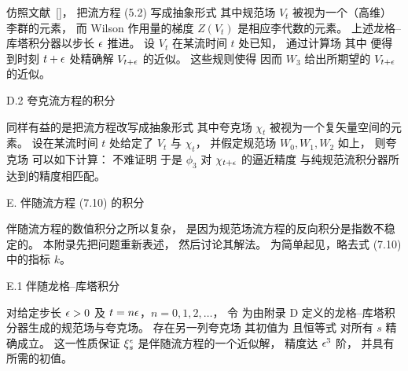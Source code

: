 仿照文献~[\cite{WilsonFlow}]，
把流方程 (5.2) 写成抽象形式
其中规范场 $V_t$
被视为一个（高维）李群的元素，
而 Wilson 作用量的梯度 $Z(V_t)$ 是相应李代数的元素。
上述龙格--库塔积分器以步长 $\epsilon$ 推进。
设 $V_t$ 在某流时间 $t$ 处已知，
通过计算场
其中
便得到时刻 $t+\epsilon$ 处精确解 $V_{t+\epsilon}$ 的近似。
这些规则使得
因而 $W_3$ 给出所期望的 $V_{t+\epsilon}$ 的近似。


\lussubsec D.2 夸克流方程的积分

同样有益的是把流方程改写成抽象形式
其中夸克场 $\chi_t$ 被视为一个复矢量空间的元素。
设在某流时间 $t$ 处给定了 $V_t$ 与 $\chi_t$，
并假定规范场 $W_0,W_1,W_2$ 如上，
则夸克场
可以如下计算：
不难证明
于是 $\phi_3$ 对 $\chi_{t+\epsilon}$ 的逼近精度
与纯规范流积分器所达到的精度相匹配。



\lusapp E. 伴随流方程 (7.10) 的积分

伴随流方程的数值积分之所以复杂，
是因为规范场流方程的反向积分是指数不稳定的。
本附录先把问题重新表述，
然后讨论其解法。
为简单起见，略去式 (7.10) 中的指标 $k$。


\lussubsec E.1 伴随龙格--库塔积分

对给定步长 $\epsilon>0$ 及 $t=n\epsilon$，$n=0,1,2,\ldots$，
令
为由附录 D 定义的龙格--库塔积分器生成的规范场与夸克场。
存在另一列夸克场
其初值为
且恒等式
对所有 $s$ 精确成立。
这一性质保证 $\xi_s^{\epsilon}$ 是伴随流方程的一个近似解，
精度达 $\epsilon^3$ 阶，
并具有所需的初值。

